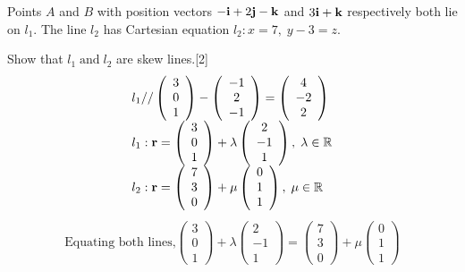 \documentclass[12pt, a4 paper]{article}
\begin{document}
\begin{outline}[enumerate]
					\color{black}
					\1 Points $A$ and $B$ with position vectors $ - {\bf{i}} + 2{\bf{j}} - {\bf{k}}$ and $3{\bf{i}} + {\bf{k}}$ respectively both lie on ${l_1}$. The line ${l_2}$ has Cartesian equation ${l_2}:x = 7,\;y - 3 = z$.
																	
					\2 Show that ${l_1}\;{\textrm{and}}\;{l_2}$ are skew lines.\hfill[2]
					\color{blue}
					\[\begin{array}{l}{l_1}{\textrm{//}}\left( {\begin{array}{*{20}{c}}3\\0\\1\end{array}} \right) - \left( {\begin{array}{*{20}{c}}{ - 1}\\2\\{ - 1}\end{array}} \right) = \left( {\begin{array}{*{20}{c}}4\\{ - 2}\\2\end{array}} \right)\\{l_1}:{\bf{r}} = \left( {\begin{array}{*{20}{c}}3\\0\\1\end{array}} \right) + \lambda \left( {\begin{array}{*{20}{c}}2\\{ - 1}\\1\end{array}} \right),\;\lambda  \in \mathbb{R}\\{l_2}:{\bf{r}} = \left( {\begin{array}{*{20}{c}}7\\3\\0\end{array}} \right) + \mu \left( {\begin{array}{*{20}{c}}0\\1\\1\end{array}} \right),\;\mu  \in \mathbb{R}\end{array}\]
					\[\begin{array}{l}{\textrm{Equating both lines,}}\left( {\begin{array}{*{20}{c}}3\\0\\1\end{array}} \right) + \lambda \left( {\begin{array}{*{20}{c}}2\\{ - 1}\\1\end{array}} \right) = \left( {\begin{array}{*{20}{c}}7\\3\\0\end{array}} \right) + \mu \left( {\begin{array}{*{20}{c}}0\\1\\1\end{array}} \right)\end{array}\]

\end{outline}
\end{document}
